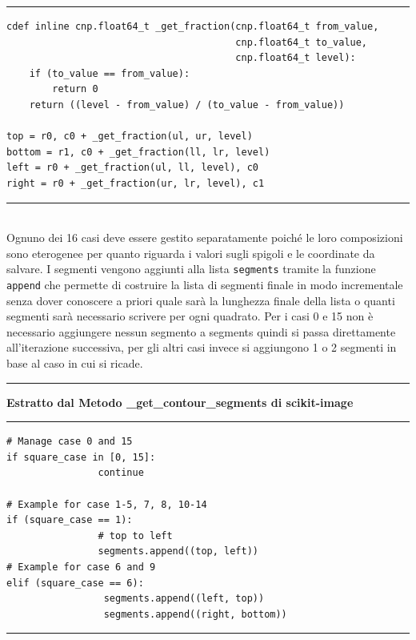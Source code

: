 \documentclass[12pt,a4paper]{report}
\begin{document}
\noindent\rule[0.5ex]{\linewidth}{1pt}
\begin{lstlisting}
cdef inline cnp.float64_t _get_fraction(cnp.float64_t from_value,
                                        cnp.float64_t to_value,
                                        cnp.float64_t level):
    if (to_value == from_value):
        return 0
    return ((level - from_value) / (to_value - from_value))

top = r0, c0 + _get_fraction(ul, ur, level)
bottom = r1, c0 + _get_fraction(ll, lr, level)
left = r0 + _get_fraction(ul, ll, level), c0
right = r0 + _get_fraction(ur, lr, level), c1
\end{lstlisting}
\noindent\rule[0.5ex]{\linewidth}{1pt} \\[10pt]
Ognuno dei 16 casi deve essere gestito separatamente poiché le loro composizioni sono eterogenee per quanto riguarda i valori sugli spigoli e le coordinate da salvare.  
I segmenti vengono aggiunti alla lista  \verb|segments| tramite la funzione  \verb|append| che permette di costruire la lista di segmenti finale in modo incrementale senza dover conoscere a priori quale sarà la lunghezza finale della lista o quanti segmenti sarà necessario scrivere per ogni quadrato.  Per i casi 0 e 15 non è necessario aggiungere nessun segmento a segments quindi si passa direttamente all'iterazione successiva, per gli altri casi invece si aggiungono 1 o 2 segmenti in base al caso in cui si ricade.\\[10pt]
\noindent\rule[0.5ex]{\linewidth}{2pt}
\small{\textbf{Estratto dal Metodo \_get\_contour\_segments di scikit-image}} \\
\noindent\rule[0.5ex]{\linewidth}{1pt}
\begin{lstlisting}
# Manage case 0 and 15
if square_case in [0, 15]:
                continue

# Example for case 1-5, 7, 8, 10-14
if (square_case == 1): 
                # top to left
                segments.append((top, left))
# Example for case 6 and 9
elif (square_case == 6):
                 segments.append((left, top))
                 segments.append((right, bottom))
\end{lstlisting}
\noindent\rule[0.5ex]{\linewidth}{1pt} \newpage

\end{document}
